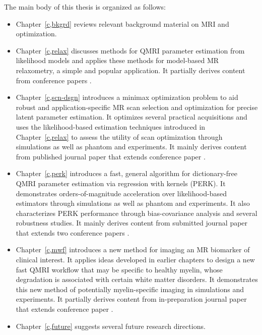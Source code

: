 The main body of this thesis is organized as follows:
\begin{itemize}
\setlength\itemsep{0.5em}
	\item{%
		Chapter~\ref{c,bkgrd} reviews 
		relevant background material
		on MRI and optimization.
	}%
	\item{%
		Chapter~\ref{c,relax} discusses methods 
		for QMRI parameter estimation 
		from likelihood models 
		and applies these methods 
		for model-based MR relaxometry,
		a simple and popular application.
		It partially derives content
		from conference papers 
		\cite{nataraj:14:rje,nataraj:14:mbe}.
	}%
	\item{%
		Chapter~\ref{c,scn-dsgn} introduces
		a minimax optimization problem
		to aid robust and application-specific 
		MR scan selection and optimization 
		for precise latent parameter estimation.
		It optimizes several practical acquisitions 
		and uses the likelihood-based estimation techniques 
		introduced in Chapter~\ref{c,relax}
		to assess the utility
		of scan optimization
		through simulations 
		as well as phantom and \invivo experiments.
		It mainly derives content
		from published journal paper
		\cite{nataraj:17:oms}
		that extends conference paper
		\cite{nataraj:15:amm}.
	}%
	\item{%
		Chapter~\ref{c,perk} introduces
		a fast, general algorithm
		for dictionary-free QMRI parameter estimation
		via regression with kernels (PERK).
		It demonstrates orders-of-magnitude acceleration 
		over likelihood-based estimators
		through simulations
		as well as phantom and \invivo experiments.
		It also characterizes PERK performance
		through bias-covariance analysis 
		and several robustness studies.
		It mainly derives content 
		from submitted journal paper
		\cite{nataraj::dfm} 
		that extends two conference papers
		\cite{nataraj:17:dfm,nataraj:17:slw}.
	}%
	\item{%
		Chapter~\ref{c,mwf} introduces a new method 
		for imaging an MR biomarker of clinical interest. 
		It applies ideas 
		developed in earlier chapters
		to design a new fast QMRI workflow
		that may be specific to healthy myelin,
		whose degradation is associated
		with certain white matter disorders.
		It demonstrates this new method 
		of potentially myelin-specific imaging
		in simulations and \invivo experiments.
		It partially derives content 
		from in-preparation journal paper \cite{nataraj::fmw}
		that extends conference paper \cite{nataraj:17:mwf}.
	}%
	\item{%
		Chapter~\ref{c,future} suggests 
		several future research directions.
	}%
\end{itemize}


